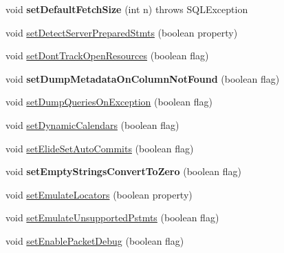 \begin{DoxyCompactItemize}
\mbox{\label{classcom_1_1mysql_1_1jdbc_1_1_multi_host_my_s_q_l_connection_a4624c3fde7b550aac82cb65d76a8dd84}} 
void {\bfseries set\+Default\+Fetch\+Size} (int n)  throws S\+Q\+L\+Exception 
\item 
void \mbox{\hyperlink{classcom_1_1mysql_1_1jdbc_1_1_multi_host_my_s_q_l_connection_a9bc00ee02ec2cb57883a27ac982ed215}{set\+Detect\+Server\+Prepared\+Stmts}} (boolean property)
\item 
void \mbox{\hyperlink{classcom_1_1mysql_1_1jdbc_1_1_multi_host_my_s_q_l_connection_a1a0edce81558c2e961ddf936a2410fe3}{set\+Dont\+Track\+Open\+Resources}} (boolean flag)
\item 
\mbox{\label{classcom_1_1mysql_1_1jdbc_1_1_multi_host_my_s_q_l_connection_a95b92eca8c750ea26c679baccfe0224f}} 
void {\bfseries set\+Dump\+Metadata\+On\+Column\+Not\+Found} (boolean flag)
\item 
void \mbox{\hyperlink{classcom_1_1mysql_1_1jdbc_1_1_multi_host_my_s_q_l_connection_ad62d20e58b21ef53f69e1c7c39325ef8}{set\+Dump\+Queries\+On\+Exception}} (boolean flag)
\item 
void \mbox{\hyperlink{classcom_1_1mysql_1_1jdbc_1_1_multi_host_my_s_q_l_connection_affcca6d6db55ca52fb6b29fdba761ca8}{set\+Dynamic\+Calendars}} (boolean flag)
\item 
void \mbox{\hyperlink{classcom_1_1mysql_1_1jdbc_1_1_multi_host_my_s_q_l_connection_a35d47c30cf0ef068eea0302f63e99226}{set\+Elide\+Set\+Auto\+Commits}} (boolean flag)
\item 
\mbox{\label{classcom_1_1mysql_1_1jdbc_1_1_multi_host_my_s_q_l_connection_a2cbdfd7cfdac78d0af8119f2c0b7a45b}} 
void {\bfseries set\+Empty\+Strings\+Convert\+To\+Zero} (boolean flag)
\item 
void \mbox{\hyperlink{classcom_1_1mysql_1_1jdbc_1_1_multi_host_my_s_q_l_connection_acf59bfc5610337b83b617986cfb1b2a5}{set\+Emulate\+Locators}} (boolean property)
\item 
void \mbox{\hyperlink{classcom_1_1mysql_1_1jdbc_1_1_multi_host_my_s_q_l_connection_a7c475a0b1f3d339fa0bab4863ac31609}{set\+Emulate\+Unsupported\+Pstmts}} (boolean flag)
\item 
void \mbox{\hyperlink{classcom_1_1mysql_1_1jdbc_1_1_multi_host_my_s_q_l_connection_a08ebf87d3511967776a8f2047453f72b}{set\+Enable\+Packet\+Debug}} (boolean flag)

\end{DoxyCompactItemize}
